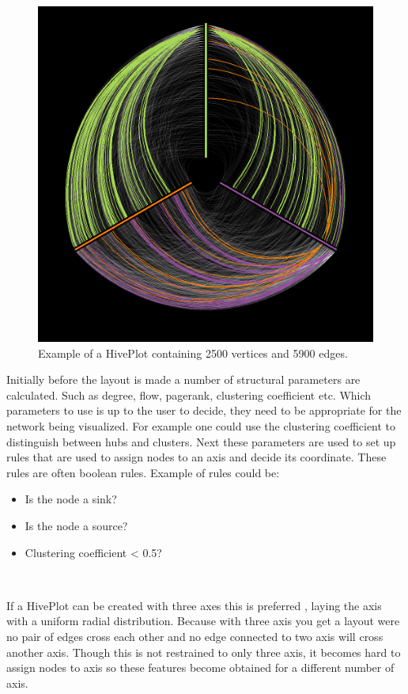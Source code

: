 \documentclass[a4paper,11pt]{kth-mag}
\begin{document}
\begin{figure}[!htbp]
	\centering
	\includegraphics[scale=0.5]{hiveplotEx1}
	\caption{Example of a HivePlot containing 2500 vertices and 5900 edges.}
	\label{fig:hive_plot}
\end{figure}

Initially before the layout is made a number of structural parameters are calculated. Such as degree, flow, pagerank, clustering coefficient etc. Which parameters to use is up to the user to decide, they need to be appropriate for the network
being visualized. For example one could use the clustering coefficient to distinguish between hubs and clusters. Next these parameters are used to set up rules that are used to assign nodes to an axis and decide its coordinate. These rules
are often boolean rules. Example of rules could be: \
\begin{itemize}
	\item{Is the node a sink?}
	\item{Is the node a source?}
	\item{Clustering coefficient < 0.5?}
\end{itemize}
\

If a HivePlot can be created with three axes this is preferred \cite{Krzywinski01092012}, laying the axis with a uniform radial distribution. Because with three axis you get a layout were no pair of edges cross each other 
and no edge connected to two axis will cross another axis. Though this is not restrained to only three axis, it becomes hard to assign nodes to axis so these features become obtained for a different number of axis.
\end{document}

